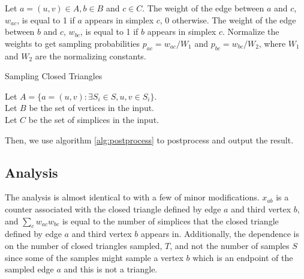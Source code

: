 \documentclass{article}
\begin{document}
Let $a=(u,v) \in A, b \in B$ and $c \in C$. The weight of the
edge between $a$ and $c$, $w_{ac}$, is equal to 1 if $a$ appears in
simplex $c$, 0 otherwise. The weight of the edge between 
$b$ and $c$, $w_{bc}$, is equal to 1 if $b$ appears in simplex $c$.
Normalize the weights to get sampling probabilities
$p_{ac} = w_{ac}/W_1$ and $p_{bc} = w_{bc}/W_2$,
where $W_1$ and $W_2$ are the normalizing constants.

\begin{algorithm}\label{alg:closedsampling}
  \caption{Sampling Closed Triangles}
  Let $A = \{a = (u,v) : \exists S_i \in S, u,v \in S_i \}$.\\
  Let $B$ be the set of vertices in the input.\\
  Let $C$ be the set of simplices in the input.\\
\end{algorithm}

Then, we use algorithm \ref{alg:postprocess} to postprocess and output the result.


\subsection{Analysis}

The analysis is almost identical to \cite{diamond} with a few
of minor modifications.
$x_{ab}$ is a counter associated with
the closed triangle defined by edge $a$ and third vertex $b$,
and $\sum\limits_c w_{ac}w_{bc}$ is equal to the number of 
simplices that the closed triangle defined by edge $a$ and 
third vertex $b$ appears in.
Additionally, the dependence is on the number of closed triangles sampled, $T$,
and not the number of samples $S$ since some of the samples might 
sample a vertex $b$ which is an endpoint of the sampled edge $a$ and this
is not a triangle.
\end{document}
